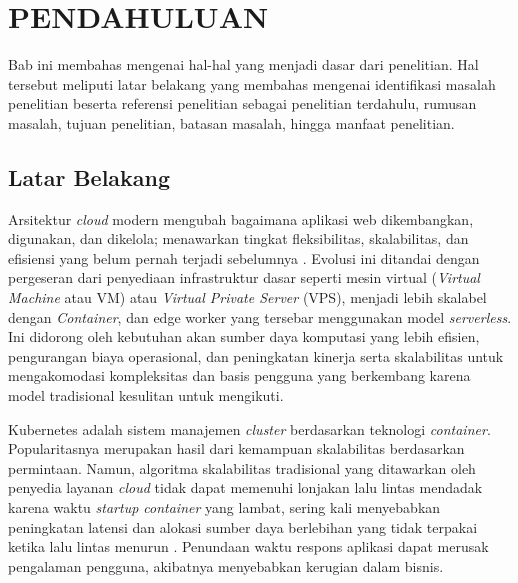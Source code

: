 
\chapter{PENDAHULUAN}
\label{sec:pendahuluan}

Bab ini membahas mengenai hal-hal yang menjadi dasar dari penelitian. Hal tersebut meliputi latar belakang yang membahas mengenai identifikasi masalah penelitian beserta referensi penelitian sebagai penelitian terdahulu, rumusan masalah, tujuan penelitian, batasan masalah, hingga manfaat penelitian.

\section{Latar Belakang}
\label{sec:latar-belakang}

Arsitektur \emph{cloud} modern mengubah bagaimana aplikasi web dikembangkan, digunakan, dan dikelola; menawarkan tingkat fleksibilitas, skalabilitas, dan efisiensi yang belum pernah terjadi sebelumnya \citep{smit2013supporting}. Evolusi ini ditandai dengan pergeseran dari penyediaan infrastruktur dasar seperti mesin virtual (\emph{Virtual Machine} atau VM) atau \emph{Virtual Private Server} (VPS), menjadi lebih skalabel dengan \emph{Container}, dan edge worker yang tersebar menggunakan model \emph{serverless}. Ini didorong oleh kebutuhan akan sumber daya komputasi yang lebih efisien, pengurangan biaya operasional, dan peningkatan kinerja serta skalabilitas untuk mengakomodasi kompleksitas dan basis pengguna yang berkembang karena model tradisional kesulitan untuk mengikuti.

Kubernetes adalah sistem manajemen \emph{cluster} berdasarkan teknologi \emph{container}. Popularitasnya merupakan hasil dari kemampuan skalabilitas berdasarkan permintaan. Namun, algoritma skalabilitas tradisional yang ditawarkan oleh penyedia layanan \emph{cloud} tidak dapat memenuhi lonjakan lalu lintas mendadak karena waktu \emph{startup container} yang lambat, sering kali menyebabkan peningkatan latensi dan alokasi sumber daya berlebihan yang tidak terpakai ketika lalu lintas menurun \citep{yang2019elax}. Penundaan waktu respons aplikasi dapat merusak pengalaman pengguna, akibatnya menyebabkan kerugian dalam bisnis.


